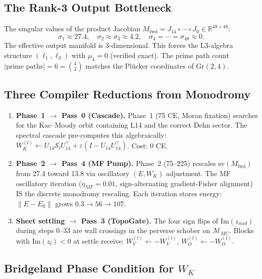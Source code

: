 \documentclass[11pt]{amsart}
\begin{document}
\subsection{The Rank-3 Output Bottleneck}

The singular values of the product Jacobian
$M_\mathrm{fwd} = J_{14}\circ\cdots\circ J_0 \in \mathbb{R}^{48\times48}$:
\[
  \sigma_1 \approx 27.4,\quad
  \sigma_2 \approx \sigma_3 \approx 4.2,\quad
  \sigma_4 = \cdots = \sigma_{48} \approx 0.
\]
The effective output manifold is 3-dimensional.
This forces the L3-algebra structure
$(\ell_1,\ell_3)$ with $\mu_4=0$ (verified exact).
The prime path count $|\text{prime paths}| = 6 = \binom{4}{2}$
matches the Pl\"{u}cker coordinates of $\mathrm{Gr}(2,4)$.

\subsection{Three Compiler Reductions from Monodromy}

\begin{enumerate}
  \item \textbf{Phase~1 $\to$ Pass~0 (Cascade).}
    Phase~1 (75 CE, Moran fixation) searches for the Kac--Moody
    orbit containing L14 and the correct Dehn sector.
    The spectral cascade pre-computes this algebraically:
    $W_K^{(l)} \leftarrow U_{14}\mathcal{S}_l U_{14}^\top
    + \varepsilon(I - U_{14}U_{14}^\top)$.
    Cost: 0 CE.

  \item \textbf{Phase~2 $\to$ Pass~4 (MF Pump).}
    Phase~2 (75--225) rescales $\mathrm{sv}(M_\mathrm{fwd})$
    from 27.4 toward 13.8 via oscillatory $(E,W_K)$ adjustment.
    The MF oscillatory iteration ($\eta_{MF}=0.01$, sign-alternating
    gradient-Fisher alignment) IS the discrete monodromy rescaling.
    Each iteration stores energy: $\|E-E_0\|$ grows $0.3\to56\to107$.

  \item \textbf{Sheet settling $\to$ Pass~3 (TopoGate).}
    The four sign flips of $\mathrm{Im}(z_{mid})$ during steps 0--33
    are wall crossings in the perverse schober on $\mathcal{M}_{MC}$.
    Blocks with $\mathrm{Im}(z_l)<0$ at settle receive:
    $W_V^{(l)}\leftarrow -W_V^{(l)}$, $W_O^{(l)}\leftarrow -W_O^{(l)}$.
\end{enumerate}

\subsection{Bridgeland Phase Condition for $W_K$}
\end{document}
